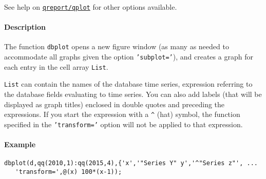 See help on \href{qreport/qplot}{\texttt{qreport/qplot}} for other
options available.

\paragraph{Description}

The function \texttt{dbplot} opens a new figure window (as many as
needed to accommodate all graphs given the option \texttt{'subplot='}),
and creates a graph for each entry in the cell array \texttt{List}.

\texttt{List} can contain the names of the database time series,
expression referring to the database fields evaluating to time series.
You can also add labels (that will be displayed as graph titles)
enclosed in double quotes and preceding the expressions. If you start
the expression with a \texttt{\^{}} (hat) symbol, the function specified
in the \texttt{'transform='} option will not be applied to that
expression.

\paragraph{Example}

\begin{verbatim}
dbplot(d,qq(2010,1):qq(2015,4),{'x','"Series Y" y','^"Series z"', ...
   'transform=',@(x) 100*(x-1));
\end{verbatim}


